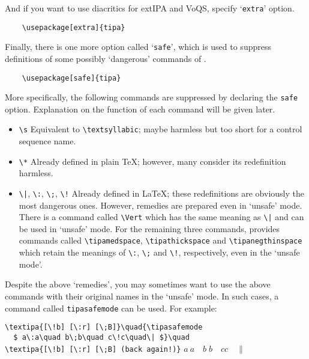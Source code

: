 And if you want to use diacritics for extIPA and Vo\-QS, specify
`\texttt{extra}' option.

\begin{verbatim}
    \usepackage[extra]{tipa}
\end{verbatim}

Finally, there is one more option called `\texttt{safe}', which is used
to suppress definitions of some possibly `dangerous' commands of
\tipa.

\begin{verbatim}
    \usepackage[safe]{tipa}
\end{verbatim}

More specifically, the following commands are suppressed by declaring
the \texttt{safe} option.  Explanation on the function of each command
will be given later.

\begin{itemize}
\itemsep0pt
\item \verb|\s| \quad Equivalent to \verb|\textsyllabic|; maybe harmless
  but too short for a control sequence name.
\item \verb|\*| \quad Already defined in plain \TeX;  however, many consider
  its redefinition harmless.
\item \verb+\|+, \verb|\:|, \verb|\;|, \verb|\!| \quad Already defined in
  \LaTeX; these redefinitions are obviously the most dangerous
  ones. However, remedies are prepared even in `unsafe' mode.
  There is a command called \verb|\Vert| which has the same meaning as 
  \verb+\|+ and can be used in `unsafe' mode. For the remaining three
  commands, \tipa{} provides commands called \verb|\tipamedspace|,
  \verb|\tipathickspace| and \verb|\tipanegthinspace| which retain the
  meanings of \verb|\:|, \verb|\;| and \verb|\!|, respectively, even in
  the `unsafe mode'.
\end{itemize}\label{unsafemode}

Despite the above `remedies', you may sometimes want to use the above
commands with their original names in the `unsafe' mode. In such
cases, a command called \texttt{\tbs tipasafemode} can be used. For
example:

\begin{tipaexample}
  \yitem
    \verb+\textipa{[\!b] [\:r] [\;B]}\quad{\tipasafemode+\\
    \verb+  $ a\:a\quad b\;b\quad c\!c\quad\| $}\quad+\\
    \verb+\textipa{[\!b] [\:r] [\;B] (back again!)}+
  \yitem
    \textipa{[\!b] [\:r] [\;B]}\quad
    {\tipasafemode $ a\:a\quad b\;b\quad c\!c\quad\| $}\quad
\end{tipaexample}

